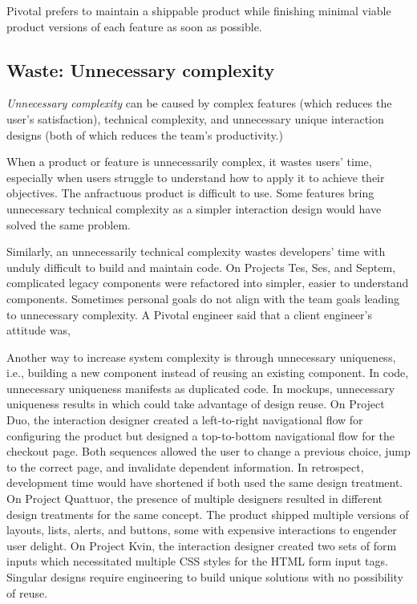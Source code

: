 Pivotal prefers to maintain a shippable product while finishing minimal viable product versions of each feature as soon as possible. 

\subsection{Waste: Unnecessary complexity}
\textit{Unnecessary complexity} can be caused by complex features (which reduces the user's satisfaction), technical complexity, and unnecessary unique interaction designs (both of which reduces the team's productivity.) 

When a product or feature is unnecessarily complex, it wastes users' time, especially when users struggle to understand how to apply it to achieve their objectives. The anfractuous product is difficult to use. Some features bring unnecessary technical complexity as a simpler interaction design would have solved the same problem. %

Similarly, an unnecessarily technical complexity wastes developers' time with unduly difficult to build and maintain code. On Projects Tes, Ses, and Septem, complicated legacy components were refactored into simpler, easier to understand components. Sometimes personal goals do not align with the team goals leading to unnecessary complexity. A Pivotal engineer said that a client engineer's attitude was, 

Another way to increase system complexity is through unnecessary uniqueness, i.e., building a new component instead of reusing an existing component. In code, unnecessary uniqueness manifests as duplicated code. In mockups, unnecessary uniqueness results in  which could take advantage of design reuse. On Project Duo, the interaction designer created a left-to-right navigational flow for configuring the product but designed a top-to-bottom navigational flow for the checkout page. Both sequences allowed the user to change a previous choice, jump to the correct page, and invalidate dependent information. In retrospect, development time would have shortened if both used the same design treatment. On Project Quattuor, the presence of multiple designers resulted in different design treatments for the same concept. The product shipped multiple versions of layouts, lists, alerts, and buttons, some with expensive interactions to engender user delight. On Project Kvin, the interaction designer created two sets of form inputs which necessitated multiple CSS styles for the HTML form input tags. Singular designs require engineering to build unique solutions with no possibility of reuse.   

